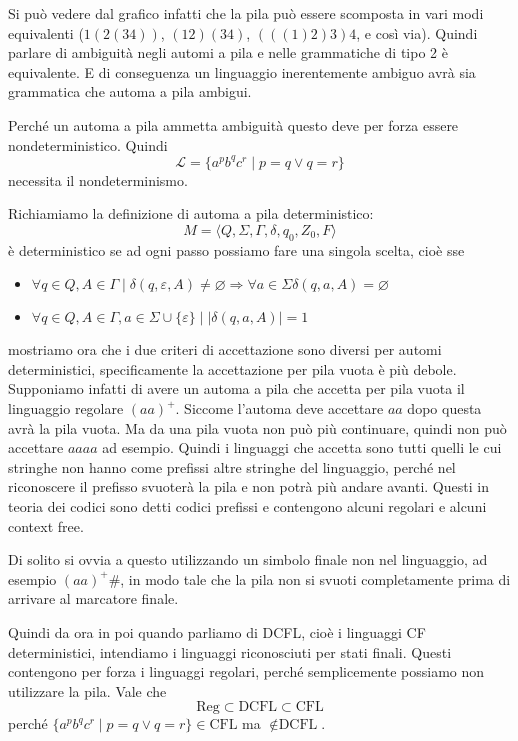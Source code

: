 \documentclass[12pt]{report}
\theoremstyle{definition}
\begin{document}
Si può vedere dal grafico infatti che la pila può essere scomposta in vari modi equivalenti ($1(2(34))$, $(12)(34)$, $(((1)2)3)4$, e così via). %
Quindi parlare di ambiguità negli automi a pila e nelle grammatiche di tipo 2 è equivalente.
E di conseguenza un linguaggio inerentemente ambiguo avrà sia grammatica che automa a pila ambigui.

Perché un automa a pila ammetta ambiguità questo deve per forza essere nondeterministico.
Quindi
$$ \mathcal{L} = \{ a^p b^q c^r \mid p = q \vee q = r \} $$
necessita il nondeterminismo.

Richiamiamo la definizione di automa a pila deterministico:
$$ M = \langle Q, \Sigma, \Gamma, \delta, q_0, Z_0, F \rangle $$
è deterministico se ad ogni passo possiamo fare una singola scelta, cioè sse
\begin{itemize}
	\item $\forall q \in Q, A \in \Gamma \mid \delta(q, \varepsilon, A) \neq \varnothing \Rightarrow \forall a \in \Sigma \delta(q, a, A) = \varnothing $
	\item $\forall q \in Q, A \in \Gamma, a \in \Sigma \cup \{ \varepsilon \} \mid | \delta(q, a, A) | = 1 $
\end{itemize}
mostriamo ora che i due criteri di accettazione sono diversi per automi deterministici, specificamente la accettazione per pila vuota è più debole.
Supponiamo infatti di avere un automa a pila che accetta per pila vuota il linguaggio regolare $(aa)^+$.
Siccome l'automa deve accettare $aa$ dopo questa avrà la pila vuota.
Ma da una pila vuota non può più continuare, quindi non può accettare $aaaa$ ad esempio.
Quindi i linguaggi che accetta sono tutti quelli le cui stringhe non hanno come prefissi altre stringhe del linguaggio, perché nel riconoscere il prefisso svuoterà la pila e non potrà più andare avanti.
Questi in teoria dei codici sono detti codici prefissi e contengono alcuni regolari e alcuni context free.

Di solito si ovvia a questo utilizzando un simbolo finale non nel linguaggio, ad esempio $(aa)^+ \#$, in modo tale che la pila non si svuoti completamente prima di arrivare al marcatore finale.

Quindi da ora in poi quando parliamo di DCFL, cioè i linguaggi CF deterministici, intendiamo i linguaggi riconosciuti per stati finali.
Questi contengono per forza i linguaggi regolari, perché semplicemente possiamo non utilizzare la pila.
Vale che
$$ \text{Reg} \subset \text{DCFL} \subset \text{CFL} $$
perché $\{ a^p b^q c^r \mid p = q \vee q = r \} \in \text{CFL}$ ma $\not \in \text{DCFL}$.
\end{document}
